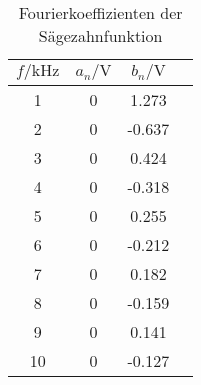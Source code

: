 \documentclass[a4paper, 12pt]{article}
\begin{document}
\subsection{}

\begin{table}[H]
\begin{center}
\begin{tabular}{@{}cccc@{}}
\toprule
$f/\si{\kilo\hertz}$ & $a_n / \si{\volt}$ & $b_n / \si{\volt}$ \\ \midrule
1                      &  0       & 1.273   \\
2                      &  0     & -0.637    \\
3                      &  0     & 0.424     \\
4                      &  0     & -0.318    \\
5                      &  0     & 0.255     \\
6                      &  0     & -0.212    \\
7                      &  0     & 0.182     \\
8                      &  0    & -0.159     \\
9                      &  0     & 0.141     \\
10                     &  0    & -0.127     \\ \bottomrule
\end{tabular}
\end{center}
\caption{Fourierkoeffizienten der Sägezahnfunktion}
\end{table}
\end{document}
